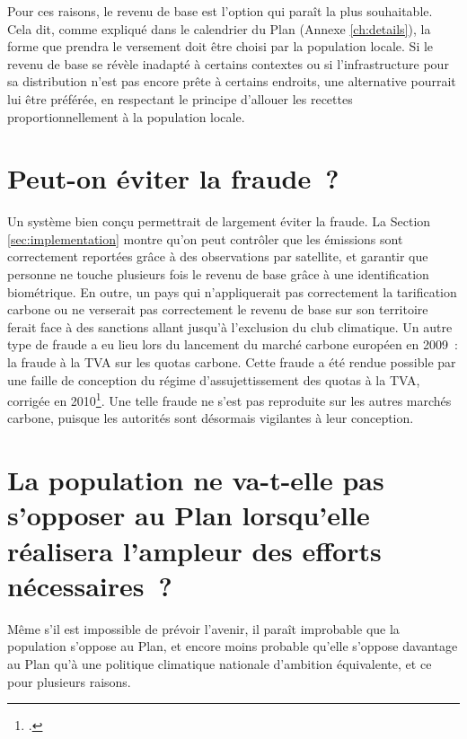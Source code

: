 \documentclass[a5paper,french,openany]{memoir}
\begin{document}
Pour ces raisons, le revenu de base est l'option qui paraît la plus souhaitable. Cela dit, comme expliqué dans le calendrier du Plan (Annexe \ref{ch:details}), la forme que prendra le versement doit être choisi par la population locale. Si le revenu de base se révèle inadapté à certains contextes ou si l'infrastructure pour sa distribution n'est pas encore prête à certains endroits, une alternative pourrait lui être préférée, en respectant le principe d'allouer les recettes proportionnellement à la population locale. 

\section*{\normalsize Peut-on éviter la fraude~?}\label{q:fraude}

Un système bien conçu permettrait de largement éviter la fraude. La Section \ref{sec:implementation} montre qu'on peut contrôler que les émissions sont correctement reportées grâce à des observations par satellite, et garantir que personne ne touche plusieurs fois le revenu de base grâce à une identification biométrique. En outre, un pays qui n'appliquerait pas correctement la tarification carbone ou ne verserait pas correctement le revenu de base sur son territoire ferait face à des sanctions allant jusqu'à l'exclusion du club climatique. Un autre type de fraude a eu lieu lors du lancement du marché carbone européen en 2009~: la fraude à la TVA sur les quotas carbone. Cette fraude a été rendue possible par une faille de conception du régime d'assujettissement des quotas à la TVA, corrigée en 2010\footnote{\cite{cour_des_comptes_fraude_2012}.}. Une telle fraude ne s'est pas reproduite sur les autres marchés carbone, puisque les autorités sont désormais vigilantes à leur conception.


\section*{\normalsize La population ne va-t-elle pas s'opposer au Plan lorsqu'elle réalisera l'ampleur des efforts nécessaires~?}\label{q:soutien}

Même s'il est impossible de prévoir l'avenir, il paraît improbable que la population s'oppose au Plan, et encore moins probable %
qu'elle s'oppose davantage au Plan qu'à une politique climatique nationale d'ambition équivalente, et ce pour plusieurs raisons. 
\end{document}
